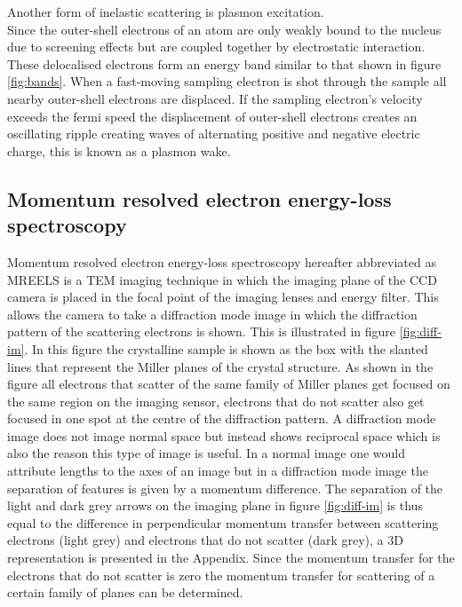 Another form of inelastic scattering is plasmon excitation.\\
Since the outer-shell electrons of an atom are only weakly bound to the nucleus due to screening effects but are coupled together by electrostatic interaction. These delocalised electrons form an energy band similar to that shown in figure \ref{fig:bands}.
When a fast-moving sampling electron is shot through the sample all nearby outer-shell electrons are displaced. If the sampling electron's velocity exceeds the fermi speed the displacement of outer-shell electrons creates an oscillating ripple creating waves of alternating positive and negative electric charge, this is known as a plasmon wake.\cite{Egerton_2008}

\subsection{Momentum resolved electron energy-loss spectroscopy}
\label{sec:MREELS}
Momentum resolved electron energy-loss spectroscopy hereafter abbreviated as MREELS is a TEM imaging technique in which the imaging plane of the CCD camera is placed in the focal point of the imaging lenses and energy filter.
This allows the camera to take a diffraction mode image in which the diffraction pattern of the scattering electrons is shown. This is illustrated in figure \ref{fig:diff-im}. In this figure the crystalline sample is shown as the box with the slanted lines that represent the Miller planes of the crystal structure.
As shown in the figure all electrons that scatter of the same family of Miller planes get focused on the same region on the imaging sensor, electrons that do not scatter also get focused in one spot at the centre of the diffraction pattern.
A diffraction mode image does not image normal space but instead shows reciprocal space which is also the reason this type of image is useful. In a normal image one would attribute lengths to the axes of an image but in a diffraction mode image the separation of features is given by a momentum difference.
The separation of the light and dark grey arrows on the imaging plane in figure \ref{fig:diff-im} is thus equal to the difference in perpendicular momentum transfer between scattering electrons (light grey) and electrons that do not scatter (dark grey), a 3D representation is presented in the Appendix.
Since the momentum transfer for the electrons that do not scatter is zero the momentum transfer for scattering of a certain family of planes can be determined.

